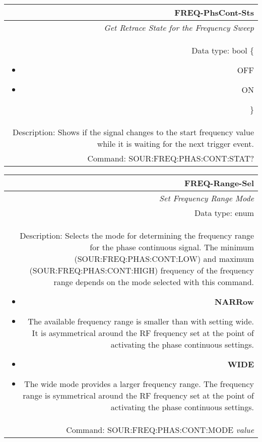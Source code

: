 \documentclass[openany]{article}
\begin{document}
		\begin{tabular}{N}
			\hline
			\bfseries FREQ-PhsCont-Sts \\ \hline
			\emph{Get Retrace State for the Frequency Sweep} \\
			Data type: bool \{\begin{itemize}[noitemsep]
				\small
				\item[] OFF
				\item[] ON
			\end{itemize}\} \\
			Description: Shows if the signal changes to the start frequency value while it is waiting for the next trigger event. \\
			Command: SOUR:FREQ:PHAS:CONT:STAT? \\

		\end{tabular}
%
		\begin{tabular}{N}
			\hline
			\bfseries FREQ-Range-Sel \\ \hline
			\emph{Set Frequency Range Mode} \\
			Data type: enum \\
			Description: Selects the mode for determining the frequency range for the phase continuous signal. The minimum (SOUR:FREQ:PHAS:CONT:LOW) and maximum (SOUR:FREQ:PHAS:CONT:HIGH) frequency of the frequency range depends on the mode selected with this command.\begin{itemize}[noitemsep]
				\small
				\item[] \textbf{NARRow}
				\item[] The available frequency range is smaller than with setting wide. It is asymmetrical around the RF frequency set at the point of activating the phase continuous settings.
				\item[] \textbf{WIDE}
				\item[] The wide mode provides a larger frequency range. The frequency range is symmetrical around the RF frequency set at the point of activating the phase continuous settings.
			\end{itemize} \\
			Command: SOUR:FREQ:PHAS:CONT:MODE \emph{value} \\

		\end{tabular}
\end{document}
